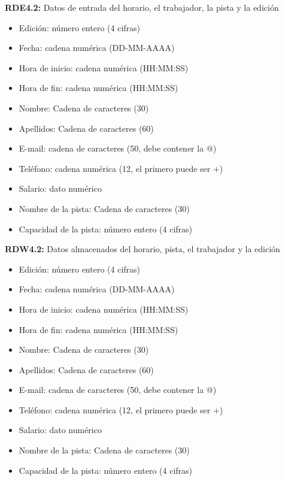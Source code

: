 \textbf{RDE4.2:} Datos de entrada del horario, el trabajador, la pista y la edición
\begin{itemize}
	\item Edición: número entero (4 cifras)
\newline
	\item Fecha: cadena numérica (DD-MM-AAAA)    
    \item Hora de inicio: cadena numérica (HH:MM:SS)
    \item Hora de fin: cadena numérica (HH:MM:SS)
\newline
	\item Nombre: Cadena de caracteres (30)
	\item Apellidos: Cadena de caracteres (60)
	\item E-mail: cadena de caracteres (50, debe contener la @)
	\item Teléfono: cadena numérica (12, el primero puede ser +)
	\item Salario: dato numérico
\newline
	\item Nombre de la pista: Cadena de caracteres (30)
	\item Capacidad de la pista: número entero (4 cifras)
\end{itemize}

\textbf{RDW4.2:} Datos almacenados del horario, pista, el trabajador y la edición
\begin{itemize}
	\item Edición: número entero (4 cifras)
\newline
	\item Fecha: cadena numérica (DD-MM-AAAA)    
    \item Hora de inicio: cadena numérica (HH:MM:SS)
    \item Hora de fin: cadena numérica (HH:MM:SS)
\newline
	\item Nombre: Cadena de caracteres (30)
	\item Apellidos: Cadena de caracteres (60)
	\item E-mail: cadena de caracteres (50, debe contener la @)
	\item Teléfono: cadena numérica (12, el primero puede ser +)
	\item Salario: dato numérico
\newline
	\item Nombre de la pista: Cadena de caracteres (30)
	\item Capacidad de la pista: número entero (4 cifras)
\end{itemize}

